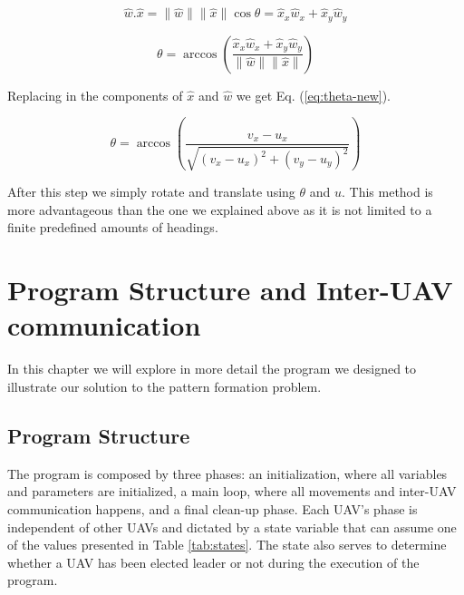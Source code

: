 \begin{equation}
	\hat{w} . \hat{x} = \parallel \hat{w} \parallel \parallel \hat{x} \parallel \cos \theta = \hat{x}_x \hat{w}_x + \hat{x}_y \hat{w}_y
	\label{eq:dot-wx}
\end{equation}

\begin{equation}
	\theta = \arccos \left(\frac{\hat{x}_x \hat{w}_x + \hat{x}_y \hat{w}_y}{\parallel \hat{w} \parallel \parallel \hat{x} \parallel}\right)
	\label{eq:theta-wx}
\end{equation}

Replacing in the components of $\hat{x}$ and $\hat{w}$ we get Eq. (\ref{eq:theta-new}). 

\begin{equation}
	\theta = \arccos \left(\frac{v_x - u_x}{\sqrt{(v_x - u_x)^2 + (v_y - u_y)^2}}\right)
	\label{eq:theta-new}
\end{equation}

After this step we simply rotate and translate using $\theta$ and $u$. This method is more advantageous than
the one we explained above as it is not limited to a finite predefined amounts of headings.

\chapter{Program Structure and Inter-UAV communication}

In this chapter we will explore in more detail the program we designed to illustrate our 
solution to the pattern formation problem.

\section{Program Structure}

The program is composed by three phases: an initialization, where all variables and parameters
are initialized, a main loop, where all movements and inter-UAV communication happens, and a 
final clean-up phase. Each UAV's phase is independent of other UAVs and dictated by a state 
variable that can assume one of the values presented in Table \ref{tab:states}. The state 
also serves to determine whether a UAV has been elected leader or not during the execution
of the program. 

